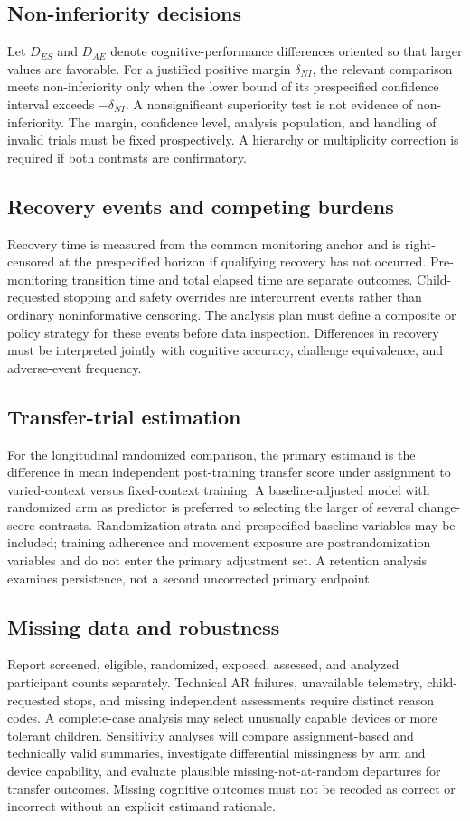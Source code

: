 \subsection{Non-inferiority decisions}
Let \(D_{ES}\) and \(D_{AE}\) denote cognitive-performance differences oriented so that larger values are favorable. For a justified positive margin \(\delta_{NI}\), the relevant comparison meets non-inferiority only when the lower bound of its prespecified confidence interval exceeds \(-\delta_{NI}\). A nonsignificant superiority test is not evidence of non-inferiority. The margin, confidence level, analysis population, and handling of invalid trials must be fixed prospectively. A hierarchy or multiplicity correction is required if both contrasts are confirmatory.

\subsection{Recovery events and competing burdens}
Recovery time is measured from the common monitoring anchor and is right-censored at the prespecified horizon if qualifying recovery has not occurred. Pre-monitoring transition time and total elapsed time are separate outcomes. Child-requested stopping and safety overrides are intercurrent events rather than ordinary noninformative censoring. The analysis plan must define a composite or policy strategy for these events before data inspection. Differences in recovery must be interpreted jointly with cognitive accuracy, challenge equivalence, and adverse-event frequency.

\subsection{Transfer-trial estimation}
For the longitudinal randomized comparison, the primary estimand is the difference in mean independent post-training transfer score under assignment to varied-context versus fixed-context training. A baseline-adjusted model with randomized arm as predictor is preferred to selecting the larger of several change-score contrasts. Randomization strata and prespecified baseline variables may be included; training adherence and movement exposure are postrandomization variables and do not enter the primary adjustment set. A retention analysis examines persistence, not a second uncorrected primary endpoint.

\subsection{Missing data and robustness}
Report screened, eligible, randomized, exposed, assessed, and analyzed participant counts separately. Technical AR failures, unavailable telemetry, child-requested stops, and missing independent assessments require distinct reason codes. A complete-case analysis may select unusually capable devices or more tolerant children. Sensitivity analyses will compare assignment-based and technically valid summaries, investigate differential missingness by arm and device capability, and evaluate plausible missing-not-at-random departures for transfer outcomes. Missing cognitive outcomes must not be recoded as correct or incorrect without an explicit estimand rationale.

